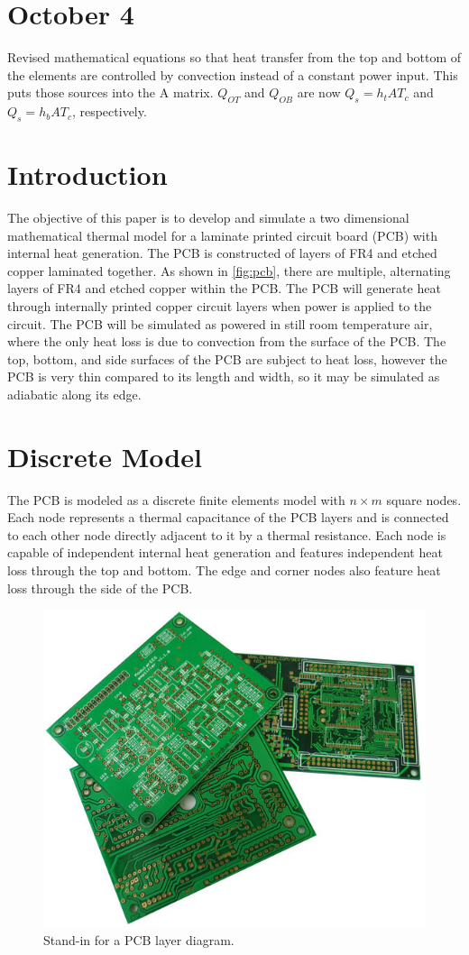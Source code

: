 \documentclass[10pt,twocolumn]{article}
\begin{document}
\section{October 4}
Revised mathematical equations so that heat transfer from the top and bottom of the elements are controlled by convection instead of a constant power input. This puts those sources into the A matrix. $Q_{OT}$ and $Q_{OB}$ are now $Q_{s} = h_{t}AT_{c}$ and $Q_{s} = h_{b}AT_{c}$, respectively.

\section{Introduction}
The objective of this paper is to develop and simulate a two dimensional mathematical thermal model for a laminate printed circuit board (PCB) with internal heat generation. The PCB is constructed of layers of FR4 and etched copper laminated together. As shown in \autoref{fig:pcb}, there are multiple, alternating layers of FR4 and etched copper within the PCB. The PCB will generate heat through internally printed copper circuit layers when power is applied to the circuit. The PCB will be simulated as powered in still room temperature air, where the only heat loss is due to convection from the surface of the PCB. The top, bottom, and side surfaces of the PCB are subject to heat loss, however the PCB is very thin compared to its length and width, so it may be simulated as adiabatic along its edge.

\section{Discrete Model}
The PCB is modeled as a discrete finite elements model with $n \times m$ square nodes. Each node represents a thermal capacitance of the PCB layers and is connected to each other node directly adjacent to it by a thermal resistance. Each node is capable of independent internal heat generation and features independent heat loss through the top and bottom. The edge and corner nodes also feature heat loss through the side of the PCB.

\begin{figure}
	\center
	\includegraphics[width=0.6\linewidth]{pcb}
	\caption{Stand-in for a PCB layer diagram.}
	\label{fig:pcb}
\end{figure}
\end{document}
